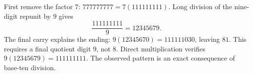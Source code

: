 First remove the factor $7$: $777777777=7(111111111)$. Long division of the nine-digit repunit by $9$ gives
\[
\boxed{\dfrac{111111111}{9}=12345679}.
\]
The final carry explains the ending: $9(12345670)=111111030$, leaving $81$. This requires a final quotient digit $9$, not $8$. Direct multiplication verifies $9(12345679)=111111111$. The observed pattern is an exact consequence of base-ten division.
